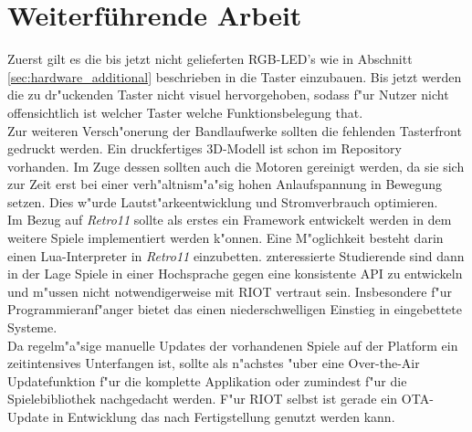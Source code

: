 \documentclass[a4paper]{article}
\begin{document}
\section{Weiterführende Arbeit}
  \label{sec:further}
  Zuerst gilt es die bis jetzt nicht gelieferten RGB-LED's wie in Abschnitt
  \ref{sec:hardware_additional} beschrieben in die Taster einzubauen. Bis
  jetzt werden die zu dr"uckenden Taster nicht visuel hervorgehoben, sodass
  f"ur Nutzer nicht offensichtlich ist welcher Taster welche Funktionsbelegung
  that.\\
  Zur weiteren Versch"onerung der Bandlaufwerke sollten die fehlenden
  Tasterfront gedruckt werden. Ein druckfertiges 3D-Modell ist schon im
  Repository vorhanden. Im Zuge dessen sollten auch die Motoren gereinigt
  werden, da sie sich zur Zeit erst bei einer verh"altnism"a"sig hohen
  Anlaufspannung in Bewegung setzen. Dies w"urde Lautst"arkeentwicklung und
  Stromverbrauch optimieren.\\
  Im Bezug auf \textit{Retro11} sollte als erstes ein Framework entwickelt
  werden in dem weitere Spiele implementiert werden k"onnen.
  Eine M"oglichkeit besteht darin einen Lua-Interpreter in \textit{Retro11}
  einzubetten. znteressierte Studierende sind dann in der Lage Spiele in einer
  Hochsprache gegen eine konsistente API zu entwickeln und m"ussen nicht
  notwendigerweise mit RIOT vertraut sein. Insbesondere f"ur Programmieranf"anger
  bietet das einen niederschwelligen Einstieg in eingebettete Systeme.\\
  Da regelm"a"sige manuelle Updates der vorhandenen Spiele auf der
  Platform ein zeitintensives Unterfangen ist, sollte als n"achstes "uber eine
  Over-the-Air Updatefunktion f"ur die komplette Applikation oder zumindest
  f"ur die Spielebibliothek nachgedacht werden. F"ur RIOT selbst ist gerade ein
  OTA-Update in Entwicklung das nach Fertigstellung genutzt werden kann.\\\\
\end{document}
